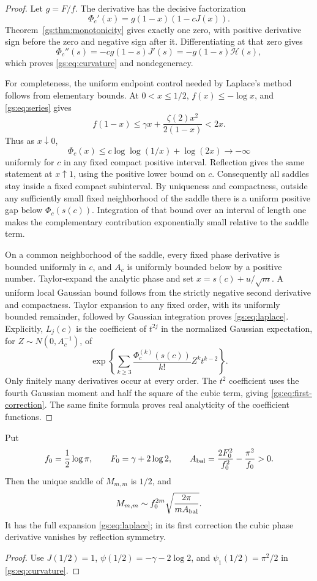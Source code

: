 \begin{proof}
Let $g=F/f$. The derivative has the decisive factorization
\[
 \Phi_c'(x)=g(1-x)(1-cJ(x)).
\]
Theorem~\ref{gs:thm:monotonicity} gives exactly one zero, with
positive derivative sign before the zero and negative sign after it.
Differentiating at that zero gives
\[
 \Phi_c''(s)=-c g(1-s)J'(s)
           =-g(1-s)\mathcal H(s),
\]
which proves \eqref{gs:eq:curvature} and nondegeneracy.

For completeness, the uniform endpoint control needed by Laplace's
method follows from elementary bounds. At $0<x\le1/2$,
$f(x)\le-\log x$, and \eqref{gs:eq:series} gives
\[
 f(1-x)\le\gamma x+\frac{\zeta(2)x^2}{2(1-x)}<2x.
\]
Thus as $x\downarrow0$,
\[
 \Phi_c(x)\le c\log\log(1/x)+\log(2x)\longrightarrow-\infty
\]
uniformly for $c$ in any fixed compact positive interval. Reflection
gives the same statement at $x\uparrow1$, using the positive lower
bound on $c$. Consequently all saddles stay inside a fixed compact
subinterval. By uniqueness and compactness, outside any sufficiently
small fixed neighborhood of the saddle there is a uniform positive
gap below $\Phi_c(s(c))$. Integration of that bound over an interval
of length one makes the complementary contribution exponentially
small relative to the saddle term.

On a common neighborhood of the saddle, every fixed phase derivative
is bounded uniformly in $c$, and $A_c$ is uniformly bounded below by a
positive number. Taylor-expand the analytic phase and set
$x=s(c)+u/\sqrt m$. A uniform local Gaussian bound follows from the
strictly negative second derivative and compactness. Taylor expansion
to any fixed order, with its uniformly bounded remainder, followed by
Gaussian integration proves \eqref{gs:eq:laplace}.
Explicitly, $L_j(c)$ is the coefficient of $t^{2j}$ in the normalized
Gaussian expectation, for $Z\sim N(0,A_c^{-1})$, of
\[
 \exp\left\{\sum_{k\ge3}
      \frac{\Phi_c^{(k)}(s(c))}{k!}Z^k t^{k-2}\right\}.
\]
Only finitely many derivatives occur at every order. The $t^2$
coefficient uses the fourth Gaussian moment and half the square of
the cubic term, giving \eqref{gs:eq:first-correction}. The same
finite formula proves real analyticity of the coefficient functions.
\end{proof}

\begin{corollary}\label{gs:cor:balanced}
Put
\[
 f_0=\frac12\log\pi,\qquad F_0=\gamma+2\log2,\qquad
 A_{\rm bal}=\frac{2F_0^2}{f_0^2}-\frac{\pi^2}{f_0}>0.
\]
Then the unique saddle of $M_{m,m}$ is $1/2$, and
\[
 M_{m,m}\sim
 f_0^{2m}\sqrt{\frac{2\pi}{mA_{\rm bal}}}.
\]
It has the full expansion \eqref{gs:eq:laplace}; in its first correction
the cubic phase derivative vanishes by reflection symmetry.
\end{corollary}
\begin{proof}
Use $J(1/2)=1$, $\psi(1/2)=-\gamma-2\log2$, and
$\psi_1(1/2)=\pi^2/2$ in \eqref{gs:eq:curvature}.
\end{proof}

